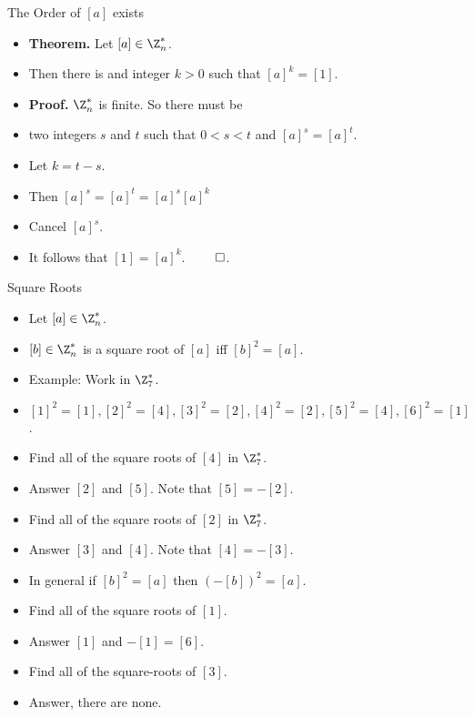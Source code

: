 \documentclass[handout]{beamer}
\begin{document}
\begin{frame}{The Order of $[a]$ exists}

\begin{itemize}
  \item \textbf{Theorem.} Let $[a]\in\Z^*_n$.
  \item Then there is and integer $k>0$ such that $[a]^k=[1]$.
  \item \textbf{Proof.} $\Z^*_n$ is finite. So there must be
  \item two integers $s$ and $t$ such that $0<s<t$ and $[a]^s=[a]^t$.
  \item Let $k=t-s$.
  \item Then $[a]^s = [a]^t = [a]^s [a]^k$
  \item Cancel $[a]^s$.
  \item It follows that $[1] = [a]^k$. $\qed$.
\end{itemize}

\end{frame}

\begin{frame}{Square Roots}

\begin{itemize}
  \item Let $[a]\in\Z_n^*$.
  \item $[b]\in\Z^*_n$ is a square root of $[a]$ iff $[b]^2=[a]$.
  \item Example: Work in $\Z_7^*$.
  \item $[1]^2=[1], [2]^2=[4], [3]^2 = [2], [4]^2=[2], [5]^2=[4], [6]^2 = [1]$.
  \item Find all of the square roots of $[4]$ in $\Z_7^*$.
  \item Answer $[2]$ and $[5]$. Note that $[5] = -[2]$.
  \item Find all of the square roots of $[2]$ in $\Z_7^*$.
  \item Answer $[3]$ and $[4]$. Note that $[4] = -[3]$.
  \item In general if $[b]^2=[a]$ then $(-[b])^2=[a]$.
  \item Find all of the square roots of $[1]$.
  \item Answer $[1]$ and $-[1]=[6]$.
  \item Find all of the square-roots of $[3]$.
  \item Answer, there are none.
\end{itemize}

\end{frame}
\end{document}
